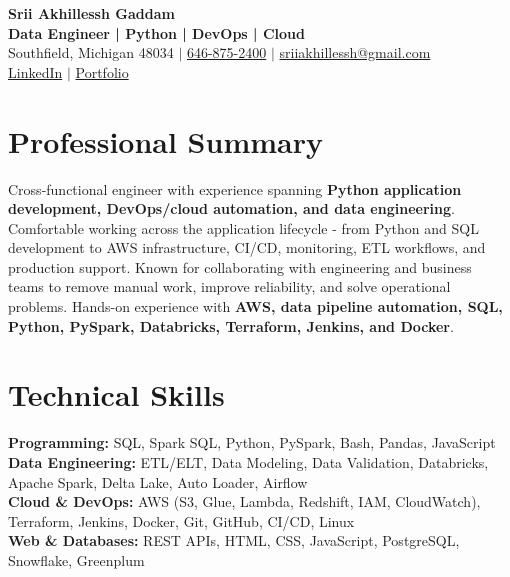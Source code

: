 \documentclass[letterpaper,10pt]{article}
\begin{document}
\fontsize{9.35pt}{10.45pt}\selectfont

\begin{center}
    {\LARGE \textbf{Srii Akhillessh Gaddam}} \\[-1pt]
    \textbf{Data Engineer | Python | DevOps | Cloud} \\[2pt]
    Southfield, Michigan 48034 $|$
    \href{tel:6468752400}{646-875-2400} $|$
    \href{mailto:sriiakhillessh@gmail.com}{sriiakhillessh@gmail.com} \\[1pt]
    \href{https://www.linkedin.com/in/srii-akhiilessh-gaddam-b48668191/}{LinkedIn} $|$
    \href{https://sriiakhillesshg.github.io/portfolio/}{Portfolio}
\end{center}
\vspace{-8pt}

\section{Professional Summary}
\small{Cross-functional engineer with experience spanning \textbf{Python application development, DevOps/cloud automation, and data engineering}. Comfortable working across the application lifecycle - from Python and SQL development to AWS infrastructure, CI/CD, monitoring, ETL workflows, and production support. Known for collaborating with engineering and business teams to remove manual work, improve reliability, and solve operational problems. Hands-on experience with \textbf{AWS, data pipeline automation, SQL, Python, PySpark, Databricks, Terraform, Jenkins, and Docker}.}

\section{Technical Skills}
\small{
\textbf{Programming:} SQL, Spark SQL, Python, PySpark, Bash, Pandas, JavaScript \\
\textbf{Data Engineering:} ETL/ELT, Data Modeling, Data Validation, Databricks, Apache Spark, Delta Lake, Auto Loader, Airflow \\
\textbf{Cloud \& DevOps:} AWS (S3, Glue, Lambda, Redshift, IAM, CloudWatch), Terraform, Jenkins, Docker, Git, GitHub, CI/CD, Linux \\
\textbf{Web \& Databases:} REST APIs, HTML, CSS, JavaScript, PostgreSQL, Snowflake, Greenplum
}

\end{document}
